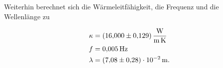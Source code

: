         \noindent Weiterhin berechnet sich die Wärmeleitfähigkeit, die Frequenz und die Wellenlänge zu

        \begin{align*}
          \kappa &= \SI{16.0 \pm 0.129}{\watt\per\metre\per\kelvin}\\
          f &= \SI{0.005}{\hertz}\\
          \lambda &= \SI{7.08(28)e-2}{\metre} .
        \end{align*}








        









